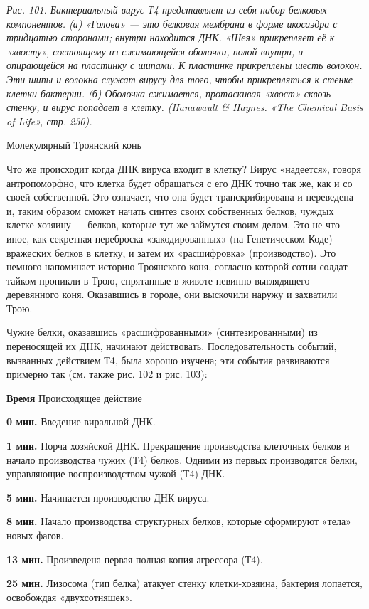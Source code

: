 \documentclass[../main.tex]{subfiles}
\begin{document}
\emph{Рис. 101. Бактериальный вирус Т4 представляет из себя набор белковых компонентов. (а) «Голова» --- это белковая мембрана в форме икосаэдра с тридцатью сторонами; внутри находится ДНК\@. «Шея» прикрепляет её к «хвосту», состоящему из сжимающейся оболочки, полой внутри, и опирающейся на пластинку с шипами. К пластинке прикреплены шесть волокон. Эти шипы и волокна служат вирусу для того, чтобы прикрепляться к стенке клетки бактерии. (б) Оболочка сжимается, протаскивая «хвост» сквозь стенку, и вирус попадает в клетку. (Hanawault \& Haynes. «The Chemical Basis of Life», стр. 230).}

Молекулярный Троянский конь

Что же происходит когда ДНК вируса входит в клетку? Вирус «надеется», говоря антропоморфно, что клетка будет обращаться с его ДНК точно так же, как и со своей собственной. Это означает, что она будет транскрибирована и переведена и, таким образом сможет начать синтез своих собственных белков, чуждых клетке-хозяину --- белков, которые тут же займутся своим делом. Это не что иное, как секретная переброска «закодированных» (на Генетическом Коде) вражеских белков в клетку, и затем их «расшифровка» (производство). Это немного напоминает историю Троянского коня, согласно которой сотни солдат тайком проникли в Трою, спрятанные в животе невинно выглядящего деревянного коня. Оказавшись в городе, они выскочили наружу и захватили Трою.

Чужие белки, оказавшись «расшифрованными» (синтезированными) из переносящей их ДНК, начинают действовать. Последовательность событий, вызванных действием Т4, была хорошо изучена; эти события развиваются примерно так (см. также рис. 102 и рис. 103):

\textbf{Время} Происходящее действие

\textbf{0 мин.} Введение виральной ДНК.

\textbf{1 мин.} Порча хозяйской ДНК\@. Прекращение производства клеточных белков и начало производства чужих (Т4) белков. Одними из первых производятся белки, управляющие воспроизводством чужой (Т4) ДНК.

\textbf{5 мин.} Начинается производство ДНК вируса.

\textbf{8 мин.} Начало производства структурных белков, которые сформируют «тела» новых фагов.

\textbf{13 мин.} Произведена первая полная копия агрессора (Т4).

\textbf{25 мин.} Лизосома (тип белка) атакует стенку клетки-хозяина, бактерия лопается, освобождая «двухсотняшек».
\end{document}
